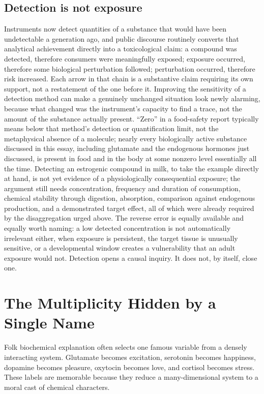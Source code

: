 \documentclass[11pt]{article}
\begin{document}
\subsection{Detection is not exposure}

Instruments now detect quantities of a substance that would have been undetectable a generation ago, and public discourse routinely converts that analytical achievement directly into a toxicological claim: a compound was detected, therefore consumers were meaningfully exposed; exposure occurred, therefore some biological perturbation followed; perturbation occurred, therefore risk increased. Each arrow in that chain is a substantive claim requiring its own support, not a restatement of the one before it. Improving the sensitivity of a detection method can make a genuinely unchanged situation look newly alarming, because what changed was the instrument's capacity to find a trace, not the amount of the substance actually present. ``Zero'' in a food-safety report typically means below that method's detection or quantification limit, not the metaphysical absence of a molecule; nearly every biologically active substance discussed in this essay, including glutamate and the endogenous hormones just discussed, is present in food and in the body at some nonzero level essentially all the time. Detecting an estrogenic compound in milk, to take the example directly at hand, is not yet evidence of a physiologically consequential exposure; the argument still needs concentration, frequency and duration of consumption, chemical stability through digestion, absorption, comparison against endogenous production, and a demonstrated target effect, all of which were already required by the disaggregation urged above. The reverse error is equally available and equally worth naming: a low detected concentration is not automatically irrelevant either, when exposure is persistent, the target tissue is unusually sensitive, or a developmental window creates a vulnerability that an adult exposure would not. Detection opens a causal inquiry. It does not, by itself, close one.

\section{The Multiplicity Hidden by a Single Name}

Folk biochemical explanation often selects one famous variable from a densely interacting system. Glutamate becomes excitation, serotonin becomes happiness, dopamine becomes pleasure, oxytocin becomes love, and cortisol becomes stress. These labels are memorable because they reduce a many-dimensional system to a moral cast of chemical characters.
\end{document}
